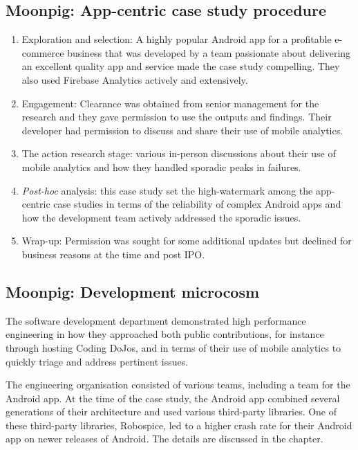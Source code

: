 \subsection{Moonpig: App-centric case study procedure}
{\small
\begin{enumerate}
    \itemsep0em
    \item Exploration and selection: A highly popular Android app for a profitable e-commerce business that was developed by a team passionate about delivering an excellent quality app and service made the case study compelling. They also used Firebase Analytics actively and extensively. 
    \item Engagement: Clearance was obtained from senior management for the research and they gave permission to use the outputs and findings. Their developer had permission to discuss and share their use of mobile analytics. 
    \item The action research stage: various in-person discussions about their use of mobile analytics and how they handled sporadic peaks in failures.
    \item \textit{Post-hoc} analysis: this case study set the high-watermark among the app-centric case studies in terms of the reliability of complex Android apps and how the development team actively addressed the sporadic issues. 
    \item Wrap-up: Permission was sought for some additional updates but declined for business reasons at the time and post IPO.
\end{enumerate}
}


\subsection{Moonpig: Development microcosm}
The software development department demonstrated high performance engineering in how they approached both public contributions, for instance through hosting Coding DoJos, and in terms of their use of mobile analytics to quickly triage and address pertinent issues.

The engineering organisation consisted of various teams, including a team for the Android app. At the time of the case study, the Android app combined several generations of their architecture and used various third-party libraries. One of these third-party libraries, Robospice, led to a higher crash rate for their Android app on newer releases of Android. The details are discussed in the  chapter.

